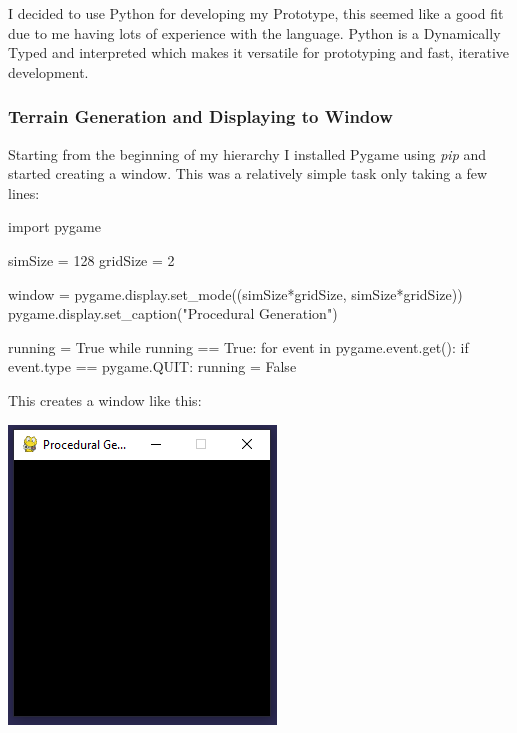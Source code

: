 \begin{flushleft}
            I decided to use Python for developing my Prototype, this seemed like a good fit due to me 
            having lots of experience with the language. Python is a Dynamically Typed and interpreted 
            which makes it versatile for prototyping and fast, iterative development.
            \subsubsection{Terrain Generation and Displaying to Window}
            Starting from the beginning of my hierarchy I installed Pygame using \textit{pip} and started creating a window.
            This was a relatively simple task only taking a few lines:
            \vspace{0.5cm}

            \normalsize
            \begin{pythoncode}
import pygame

simSize = 128
gridSize = 2

window = pygame.display.set_mode((simSize*gridSize, simSize*gridSize))
pygame.display.set_caption("Procedural Generation")

running = True
while running == True:
  for event in pygame.event.get():
    if event.type == pygame.QUIT:
      running = False
            \end{pythoncode}

            \vspace{0.5cm}

            \large
            This creates a window like this: \\ 
            \vspace{0.5cm}
            \centerline{\includegraphics{Images/Prototype/CreateWindowExample.PNG}}


\end{flushleft}

